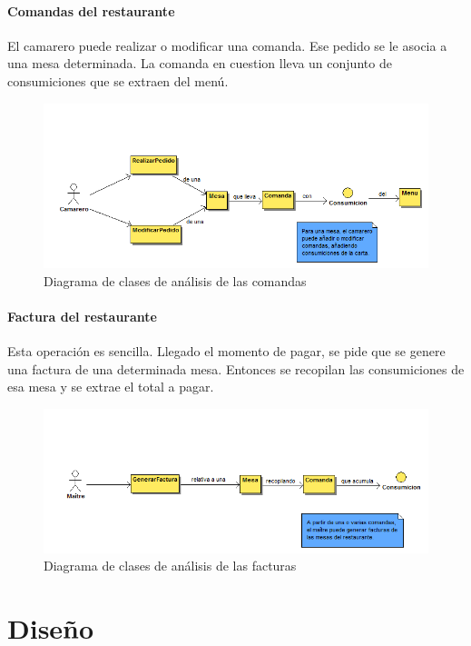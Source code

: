 \documentclass[spanish,a4paper,11pt, twoside]{report}	%
\begin{document}
		\subsection{Comandas del restaurante}
		El camarero puede realizar o modificar una comanda. Ese pedido se le asocia a una mesa determinada. La comanda en cuestion lleva un conjunto de consumiciones que se extraen del menú.
		\begin{figure}[!h]
		\centering
		\includegraphics[scale=0.5]{DCAcomandas.png}
		\caption{Diagrama de clases de análisis de las comandas}
		\end{figure}

		\subsection{Factura del restaurante}
		Esta operación es sencilla. Llegado el momento de pagar, se pide que se genere una factura de una determinada mesa. Entonces se recopilan las consumiciones de esa mesa y se extrae el total a pagar.
		\begin{figure}[!h]
		\centering
		\includegraphics[scale=0.5]{DCAfactura.png}
		\caption{Diagrama de clases de análisis de las facturas}
		\end{figure}




\setcounter{section}{0}
\part{Diseño}
\end{document}
